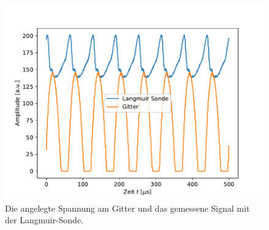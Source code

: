 \begin{figure}[H]
\centering
\includegraphics[scale=0.6]{oszi_3.pdf}
\caption{Die angelegte Spannung am Gitter und das gemessene Signal mit der Langmuir-Sonde.}
\label{fig:oszi_3}
\end{figure}
